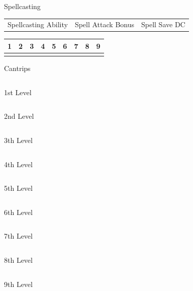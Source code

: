\documentclass[a4paper,10pt,bg=full]{dndbook} %
\def\SpellAbility{}
\def\SpellAtk{}
\def\SpellSaveDC{}
\def\FirstLevelSlots{}
\def\SecondLevelSlots{}
\def\ThirdLevelSlots{}
\def\FourthLevelSlots{}
\def\FifthLevelSlots{}
\def\SixthLevelSlots{}
\def\SeventhLevelSlots{}
\def\EightLevelSlots{}
\def\NinthLevelSlots{}
\def\Cantrips{
	\begin{tabularx}{\linewidth}{lX}
	\end{tabularx}
}
\def\FirstLevelSpells{
	\begin{tabularx}{\linewidth}{lX}
		
	\end{tabularx}
}
\def\SecondLevelSpells{
	\begin{tabularx}{\linewidth}{lX}
		
	\end{tabularx}
}
\def\ThirdLevelSpells{
	\begin{tabularx}{\linewidth}{lX}
		
	\end{tabularx}
}
\def\FourthLevelSpells{
	\begin{tabularx}{\linewidth}{lX}
		
	\end{tabularx}
}
\def\FifthLevelSpells{
	\begin{tabularx}{\linewidth}{lX}
		
	\end{tabularx}
}
\def\SixthLevelSpells{
	\begin{tabularx}{\linewidth}{lX}
		
	\end{tabularx}
}
\def\SeventhLevelSpells{
	\begin{tabularx}{\linewidth}{lX}
		
	\end{tabularx}
}
\def\EightLevelSpells{
	\begin{tabularx}{\linewidth}{lX}
		
	\end{tabularx}
}
\def\NinthLevelSpells{
	\begin{tabularx}{\linewidth}{lX}
		
	\end{tabularx}
}
\begin{document}
	{\huge Spellcasting}
	\begin{center}\normalsize
		\begin{tabularx}{\textwidth}{XXX}
			\SpellAbility &\SpellAtk &\SpellSaveDC\\\hline
			\tiny{Spellcasting Ability}	& \tiny{Spell Attack Bonus}	&\tiny{Spell Save DC}
		\end{tabularx}
		\begin{tabularx}{\linewidth}{XXXXXXXXX}
			1&2&3&4&5&6&7&8&9\\\hline
			\FirstLevelSlots&
			\SecondLevelSlots&
			\ThirdLevelSlots&
			\FourthLevelSlots&
			\FifthLevelSlots&
			\SixthLevelSlots&
			\SeventhLevelSlots&
			\EightLevelSlots&
			\NinthLevelSlots
		\end{tabularx}
	\end{center}
	\begin{minipage}[t]{.334\linewidth}\scriptsize
		\textcolor{titlered}{\large Cantrips}\\
		\Cantrips
		\textcolor{titlered}{\large 1st Level}\\
		\FirstLevelSpells
		\textcolor{titlered}{\large 2nd Level}\\
		\SecondLevelSpells
	\end{minipage}%
	\begin{minipage}[t]{.333\linewidth}\scriptsize
		\textcolor{titlered}{\large 3th Level}\\
		\ThirdLevelSpells
		\textcolor{titlered}{\large 4th Level}\\
		\FourthLevelSpells
		\textcolor{titlered}{\large 5th Level}\\
		\FifthLevelSpells
	\end{minipage}%
	\begin{minipage}[t]{.333\linewidth}\scriptsize
		\textcolor{titlered}{\large 6th Level}\\
		\SixthLevelSpells
		\textcolor{titlered}{\large 7th Level}\\
		\SeventhLevelSpells
		\textcolor{titlered}{\large 8th Level}\\
		\EightLevelSpells
		\textcolor{titlered}{\large 9th Level}\\
		\NinthLevelSpells
	\end{minipage} %
\end{document}
